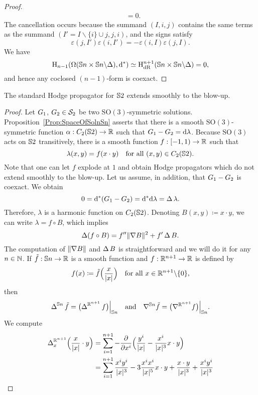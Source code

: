 \documentclass[\MainFolder/Text.tex]{subfiles}
\newcommand{\Soln}{\mathcal{S}}
\newcommand{\SO}{\mathrm{SO}}
\begin{document}
\begin{proof}
\begin{align*}
& = 0.
\end{align*}
The cancellation occurs because the summand $(I, i, j)$ contains the same terms as the summand $(I'=I\backslash\{i\}\cup j, j, i)$, and the signs satisfy
$$ \varepsilon(j,I')\varepsilon(i,I') = - \varepsilon(i,I)\varepsilon(j,I). $$
We have
$$ \mathrm{H}_{n-1}(\Omega(\mathbb{S}{n}\times\mathbb{S}{n}\backslash\Delta),\mathrm{d}^*) \simeq \mathrm{H}_{\mathrm{dR}}^{n+1}(\mathbb{S}{n}\times\mathbb{S}{n}\backslash\Delta) = 0, $$
and hence any coclosed $(n-1)$-form is coexact.
\end{proof}

\begin{Proposition}\label{Prop:StdS2}
The standard Hodge propagator for $\mathbb{S}{2}$ extends smoothly to the blow-up.
\end{Proposition}
\begin{proof}
Let $G_1$, $\GKer_2 \in \Soln_2$ be two $\SO(3)$-symmetric solutions. Proposition~\ref{Prop:SpaceOfSolnSn} asserts that there is a smooth $\SO(3)$-symmetric function $\alpha: C_2(\mathbb{S}{2})\rightarrow \mathbb{R}$ such that $G_1 - G_2 = \mathrm{d} \lambda$. Because $\SO(3)$ acts on $\mathbb{S}{2}$ transitively, there is a smooth function $f: [-1,1)\rightarrow \mathbb{R}$ such that
$$ \lambda(x,y) = f(x\cdot y)\quad\text{for all }(x,y)\in C_2(\mathbb{S}{2}). $$
Note that one can let $f$ explode at $1$ and obtain Hodge propagators which do not extend smoothly to the blow-up. Let us assume, in addition, that $G_1 - G_2$ is coexact. We obtain 
$$ 0 = \mathrm{d}^*(G_1 - G_2) = \mathrm{d}^* \mathrm{d}\lambda = \operatorname{\Delta} \lambda. $$
Therefore, $\lambda$ is a harmonic function on $C_2(\mathbb{S}{2})$. Denoting $B(x,y) \coloneqq x\cdot y$, we can write $\lambda = f\circ B$,  which implies
$$ \operatorname{\Delta}(f \circ B) = f'' \| \nabla B \|^2 + f' \operatorname{\Delta} B. $$
The computation of $\| \nabla B \|$ and $\operatorname{\Delta} B$ is straightforward and we will do it for any $n\in \mathbb{N}$. If $\tilde{f}: \mathbb{S}{n} \rightarrow \mathbb{R}$ is a smooth function and $f: \mathbb{R}^{n+1} \rightarrow \mathbb{R}$ is defined by 
$$ f(x)\coloneqq \tilde{f}\Bigl(\frac{x}{|x|}\Bigr)\quad\text{for all }x\in \mathbb{R}^{n+1}\backslash\{0\}, $$
then
$$ \Laplace^{\Sph{n}} \tilde{f} = \Restr{\bigl(\Laplace^{\R^{n+1}}f\bigr)}{\Sph{n}}\quad\text{and}\quad \Grad^{\Sph{n}} \tilde{f} = \Restr{\bigl(\Grad^{\R^{n+1}}f\bigr)}{\Sph{n}}. $$
We compute 
\begin{align*}
\Laplace_x^{\R^{n+1}} \Bigl( \frac{x}{\Abs{x}}\cdot y \Bigr) &= \sum_{i=1}^{n+1} - \frac{\partial}{\partial x^i}\Bigl(\frac{y^i}{\Abs{x}} - \frac{x^i}{\Abs{x}^3}x\cdot y\Bigr) \\
 &= \sum_{i=1}^{n+1} \frac{x^i y^i}{\Abs{x}^3} - 3 \frac{x^i x^i}{\Abs{x}^5} x \cdot y + \frac{x\cdot y}{\Abs{x}^3} + \frac{x^i y^i}{\Abs{x}^3} \\

\end{align*}
\end{proof}
\end{document}
